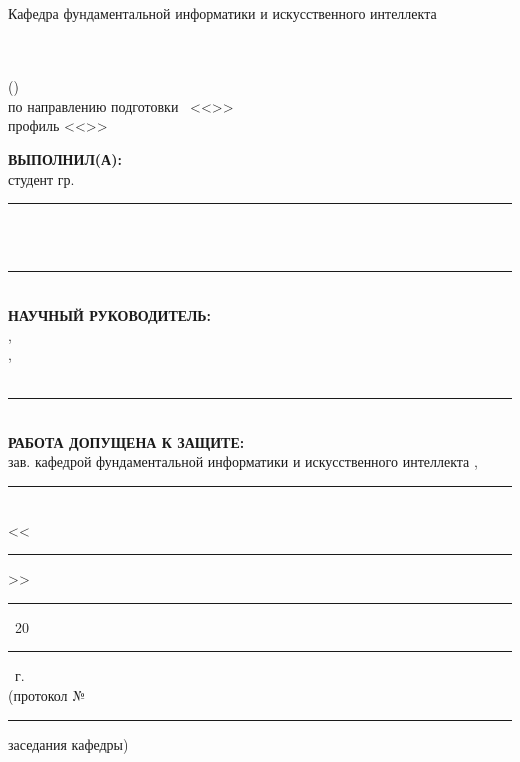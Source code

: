 \thispagestyle{empty}
\begingroup
\SingleSpacing
\setlength{\parindent}{0pt}
\begin{center}
\vkrMinistry\\
\vkrUniversityType\\
\vkrUniversityLevel\\
\vkrUniversityName\\
Кафедра фундаментальной информатики и искусственного интеллекта
\end{center}

\vfill

\begin{center}
\textbf{\MakeUppercase{\vkrTitle}}\\[0.25cm]
\MakeUppercase{\vkrWorkKind}\\
(\vkrWorkType)\\[0.15cm]
по направлению подготовки \vkrDirectionCode\ <<\vkrDirectionTitle>>\\
профиль <<\vkrProfile>>
\end{center}

\vfill

\begin{flushright}
\begin{minipage}{0.5\textwidth}
\raggedright
\textbf{ВЫПОЛНИЛ(А):}\\
студент гр. \rule{2cm}{0.4pt}\\
\vkrStudentFullName\\[0.3cm]
\rule{5cm}{0.4pt}\\[0.6cm]

\textbf{НАУЧНЫЙ РУКОВОДИТЕЛЬ:}\\
\vkrSupervisorDegree,\\
\vkrSupervisorPosition,\\
\vkrSupervisorFullName\\[0.3cm]
\rule{5cm}{0.4pt}\\[0.6cm]

\textbf{РАБОТА ДОПУЩЕНА К ЗАЩИТЕ:}\\
зав. кафедрой фундаментальной информатики и искусственного интеллекта \vkrDepartmentHeadDegree, \vkrDepartmentHead\\[0.3cm]
\rule{5cm}{0.4pt}\\
<<\rule{0.7cm}{0.4pt}>>~\rule{3cm}{0.4pt}~20\rule{0.7cm}{0.4pt}~г.\\
(протокол № \rule{1.2cm}{0.4pt} заседания кафедры)
\end{minipage}
\end{flushright}

\vfill

\begin{center}
\vkrCity\ \vkrYear
\end{center}
\endgroup
